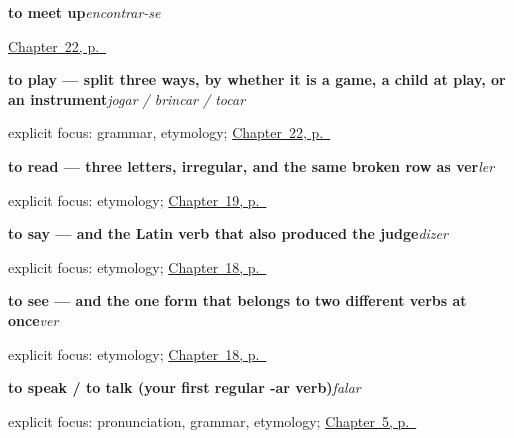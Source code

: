 \noindent\begin{minipage}[t]{\linewidth}
\raggedright
\textbf{to meet up}\enspace\emph{encontrar-se}\par
\footnotesize \hyperref[ch:pt-answering-meeting-playing]{Chapter~22, p.~\pageref*{ch:pt-answering-meeting-playing}}
\end{minipage}\par\smallskip

\noindent\begin{minipage}[t]{\linewidth}
\raggedright
\textbf{to play — split three ways, by whether it is a game, a child at play, or an instrument}\enspace\emph{jogar / brincar / tocar}\par
\footnotesize explicit focus: grammar, etymology; \hyperref[ch:pt-answering-meeting-playing]{Chapter~22, p.~\pageref*{ch:pt-answering-meeting-playing}}
\end{minipage}\par\smallskip

\noindent\begin{minipage}[t]{\linewidth}
\raggedright
\textbf{to read — three letters, irregular, and the same broken row as ver}\enspace\emph{ler}\par
\footnotesize explicit focus: etymology; \hyperref[ch:pt-mind-verbs]{Chapter~19, p.~\pageref*{ch:pt-mind-verbs}}
\end{minipage}\par\smallskip

\noindent\begin{minipage}[t]{\linewidth}
\raggedright
\textbf{to say — and the Latin verb that also produced the judge}\enspace\emph{dizer}\par
\footnotesize explicit focus: etymology; \hyperref[ch:pt-core-verbs]{Chapter~18, p.~\pageref*{ch:pt-core-verbs}}
\end{minipage}\par\smallskip

\noindent\begin{minipage}[t]{\linewidth}
\raggedright
\textbf{to see — and the one form that belongs to two different verbs at once}\enspace\emph{ver}\par
\footnotesize explicit focus: etymology; \hyperref[ch:pt-core-verbs]{Chapter~18, p.~\pageref*{ch:pt-core-verbs}}
\end{minipage}\par\smallskip

\noindent\begin{minipage}[t]{\linewidth}
\raggedright
\textbf{to speak / to talk (your first regular -ar verb)}\enspace\emph{falar}\par
\footnotesize explicit focus: pronunciation, grammar, etymology; \hyperref[ch:pt-first-verbs]{Chapter~5, p.~\pageref*{ch:pt-first-verbs}}
\end{minipage}\par\smallskip

